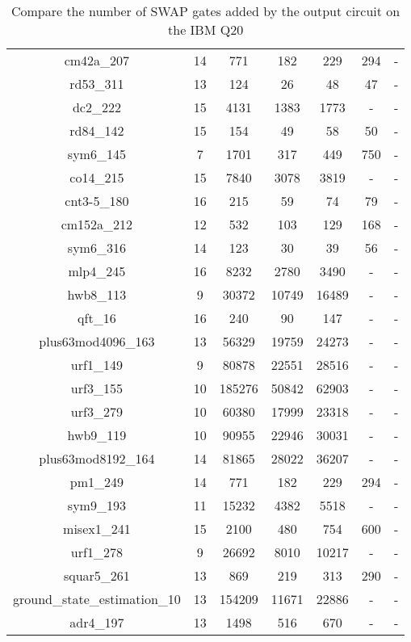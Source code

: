 \documentclass[runningheads]{llncs}
\begin{document}
\begin{table}[H]
\begin{center}
\begin{tabular}{|c|c|c|c|c|c|c|}
cm42a\_207 & 14 & 771 & 182 & 229 & 294 & - \\ 
rd53\_311 & 13 & 124 & 26 & 48 & 47 & - \\ 
dc2\_222 & 15 & 4131 & 1383 & 1773 & - & - \\ 
rd84\_142 & 15 & 154 & 49 & 58 & 50 & - \\ 
sym6\_145 & 7 & 1701 & 317 & 449 & 750 & - \\ 
co14\_215 & 15 & 7840 & 3078 & 3819 & - & - \\ 
cnt3-5\_180 & 16 & 215 & 59 & 74 & 79 & - \\ 
cm152a\_212 & 12 & 532 & 103 & 129 & 168 & - \\ 
sym6\_316 & 14 & 123 & 30 & 39 & 56 & - \\ 
mlp4\_245 & 16 & 8232 & 2780 & 3490 & - & - \\ 
hwb8\_113 & 9 & 30372 & 10749 & 16489 & - & - \\ 
qft\_16 & 16 & 240 & 90 & 147 & - & - \\ 
plus63mod4096\_163 & 13 & 56329 & 19759 & 24273 & - & - \\ 
urf1\_149 & 9 & 80878 & 22551 & 28516 & - & - \\ 
urf3\_155 & 10 & 185276 & 50842 & 62903 & - & - \\ 
urf3\_279 & 10 & 60380 & 17999 & 23318 & - & - \\ 
hwb9\_119 & 10 & 90955 & 22946 & 30031 & - & - \\ 
plus63mod8192\_164 & 14 & 81865 & 28022 & 36207 & - & - \\ 
pm1\_249 & 14 & 771 & 182 & 229 & 294 & - \\ 
sym9\_193 & 11 & 15232 & 4382 & 5518 & - & - \\ 
misex1\_241 & 15 & 2100 & 480 & 754 & 600 & - \\ 
urf1\_278 & 9 & 26692 & 8010 & 10217 & - & - \\ 
squar5\_261 & 13 & 869 & 219 & 313 & 290 & - \\ 
ground\_state\_estimation\_10 & 13 & 154209 & 11671 & 22886 & - & - \\ 
adr4\_197 & 13 & 1498 & 516 & 670 & - & - \\ 
			\hline
			\end{tabular} 
			\end{center}	
			\caption{Compare the number of SWAP gates added by the 
			output circuit on the IBM Q20 }
			\label{tab4}  
			\end{table}
\end{document}
